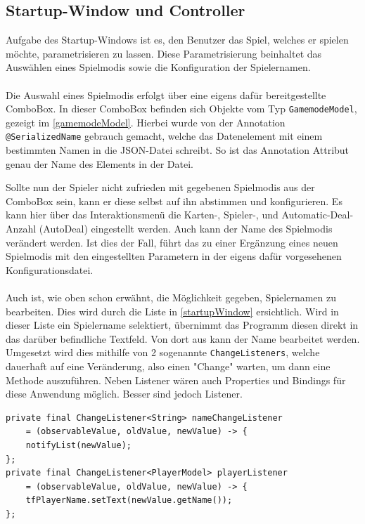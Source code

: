 \subsection{Startup-Window und Controller}\label{subsec:startupController}
Aufgabe des Startup-Windows ist es, den Benutzer das Spiel, welches er spielen möchte, parametrisieren zu lassen.
Diese Parametrisierung beinhaltet das Auswählen eines Spielmodis sowie die Konfiguration der Spielernamen.\\\\
Die Auswahl eines Spielmodis erfolgt über eine eigens dafür bereitgestellte ComboBox.
In dieser ComboBox befinden sich Objekte vom Typ \lstinline[style=java]{GamemodeModel}, gezeigt im \autoref{gamemodeModel}.
Hierbei wurde von der Annotation \lstinline[style=java]{@SerializedName} gebrauch gemacht, welche das Datenelement mit einem bestimmten Namen in die JSON-Datei schreibt.
So ist das Annotation Attribut genau der Name des Elements in der Datei.

Sollte nun der Spieler nicht zufrieden mit gegebenen Spielmodis aus der ComboBox sein, kann er diese selbst auf ihn abstimmen und konfigurieren.
Es kann hier über das Interaktionsmenü die Karten-, Spieler-, und Automatic-Deal-Anzahl (AutoDeal) eingestellt werden.
Auch kann der Name des Spielmodis verändert werden.
Ist dies der Fall, führt das zu einer Ergänzung eines neuen Spielmodis mit den eingestellten Parametern in der eigens dafür vorgesehenen Konfigurationsdatei.\\\\
Auch ist, wie oben schon erwähnt, die Möglichkeit gegeben, Spielernamen zu bearbeiten.
Dies wird durch die Liste in \autoref{startupWindow} ersichtlich.
Wird in dieser Liste ein Spielername selektiert, übernimmt das Programm diesen direkt in das darüber befindliche Textfeld.
Von dort aus kann der Name bearbeitet werden.\\
Umgesetzt wird dies mithilfe von 2 sogenannte \lstinline[style=java]{ChangeListeners}, welche dauerhaft auf eine Veränderung, also einen "Change" warten, um dann eine Methode auszuführen.
Neben Listener wären auch Properties und Bindings für diese Anwendung möglich.
Besser sind jedoch Listener.
%
\begin{lstlisting}[style=java,caption=Deklaration ChangeListener,label=changelistener]
private final ChangeListener<String> nameChangeListener
    = (observableValue, oldValue, newValue) -> {
    notifyList(newValue);
};
private final ChangeListener<PlayerModel> playerListener
    = (observableValue, oldValue, newValue) -> {
    tfPlayerName.setText(newValue.getName());
};
\end{lstlisting}
